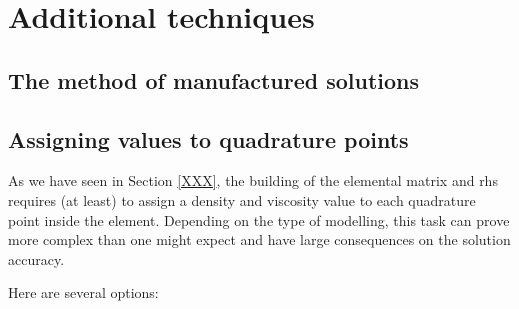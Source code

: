 \documentclass[a4paper]{article}
\begin{document}





\newpage
\section{Additional techniques}

\subsection{The method of manufactured solutions}

\subsection{Assigning values to quadrature points}

As we have seen in Section \ref{XXX}, the building of the elemental matrix and rhs
requires (at least) to assign a density and viscosity value to each quadrature point inside
the element. Depending on the type of modelling, this task can prove more complex than 
one might expect and have large consequences on the solution accuracy.

Here are several options:
\end{document}

